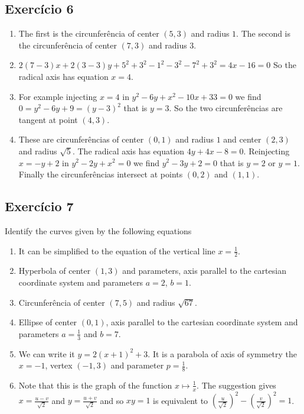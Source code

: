\subsection*{Exercício 6}
\begin{enumerate}
\item The first is the circunferência of center $(5,3)$ and radius $1$.
  The second is the circunferência of center $(7,3)$ and radius $3$.
\item $2{(7-3)}x + 2{(3-3)}y + 5^2+3^2-1^2-3^2-7^2+3^2 = 4x - 16 = 0$
  So the radical axis has equation $x=4$.
\item For example injecting $x=4$ in $y^2-6y+x^2-10x+33=0$
  we find $0=y^2-6y+9={(y-3)}^2$ that is $y=3$. So the
  two circunferências are tangent at point $(4,3)$.
\item These are circunferências of center $(0,1)$ and radius $1$ and
  center $(2,3)$ and radius $\sqrt{5}$.
  The radical axis has equation $4y+4x-8=0$.
  Reinjecting $x = -y + 2$ in $y^2-2y+x^2=0$
  we find $y^2-3y+2=0$ that is $y=2$ or $y=1$.
  Finally the circunferências intersect at points $(0,2)$ and $(1,1)$.
\end{enumerate}

\subsection*{Exercício 7}

Identify the curves given by the following equations

\begin{enumerate}
\item It can be simplified to the equation of the vertical
  line $x = \frac{1}{2}$.
\item Hyperbola of center $(1,3)$ and parameters, axis parallel to
  the cartesian coordinate system and parameters $a=2$, $b=1$.
\item Circunferência of center $(7,5)$ and radius $\sqrt{67}$.
\item Ellipse of center $(0,1)$, axis parallel to
  the cartesian coordinate system and parameters $a=\frac{1}{3}$ and
  $b=7$.
\item We can write it $y = 2{(x+1)}^2+3$. It is a parabola of axis
  of symmetry the $x=-1$, vertex $(-1,3)$ and parameter $p=\frac{1}{8}$.
\item Note that this is the graph of the function $x \mapsto \frac{1}{x}$.
  The suggestion gives
  $x = \frac{u-v}{\sqrt{2}}$ and
  $y = \frac{u+v}{\sqrt{2}}$ and so $xy=1$ is equivalent to
  $\left(\frac{u}{\sqrt{2}}\right)^2 - \left(\frac{v}{\sqrt{2}}\right)^2 = 1$.
\end{enumerate}

